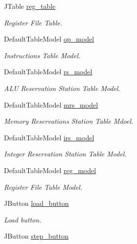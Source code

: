 \begin{DoxyCompactItemize}
\-J\-Table \hyperlink{classTomasuloGUI_a5d9e4b23a54f429c9f0135e492bc7609}{reg\-\_\-table}
\begin{DoxyCompactList}\small\item\em \-Register \-File \-Table. \end{DoxyCompactList}\item 
\-Default\-Table\-Model \hyperlink{classTomasuloGUI_a6b5d956697d14589539bb8f765c8da5c}{op\-\_\-model}
\begin{DoxyCompactList}\small\item\em \-Instructions \-Table \-Model. \end{DoxyCompactList}\item 
\-Default\-Table\-Model \hyperlink{classTomasuloGUI_a1f5a9be366c1157ec2a5eb54de8c1b5b}{rs\-\_\-model}
\begin{DoxyCompactList}\small\item\em \-A\-L\-U \-Reservation \-Station \-Table \-Model. \end{DoxyCompactList}\item 
\-Default\-Table\-Model \hyperlink{classTomasuloGUI_ad017a1554cee627c47c5cea70fc58908}{mrs\-\_\-model}
\begin{DoxyCompactList}\small\item\em \-Memory \-Reservations \-Station \-Table \-Mdoel. \end{DoxyCompactList}\item 
\-Default\-Table\-Model \hyperlink{classTomasuloGUI_a2dc4ffde9e3f919d756d89fbfd5aac46}{irs\-\_\-model}
\begin{DoxyCompactList}\small\item\em \-Integer \-Reservation \-Station \-Table \-Model. \end{DoxyCompactList}\item 
\-Default\-Table\-Model \hyperlink{classTomasuloGUI_a70e2e15d3c1154ecc5a049f373d1178d}{reg\-\_\-model}
\begin{DoxyCompactList}\small\item\em \-Register \-File \-Table \-Model. \end{DoxyCompactList}\item 
\-J\-Button \hyperlink{classTomasuloGUI_ad94e3aa704e880a905631076935771a5}{load\-\_\-button}
\begin{DoxyCompactList}\small\item\em \-Load button. \end{DoxyCompactList}\item 
\-J\-Button \hyperlink{classTomasuloGUI_ac489de22d16f3c43bae896eb5c8980a3}{step\-\_\-button}

\end{DoxyCompactItemize}
